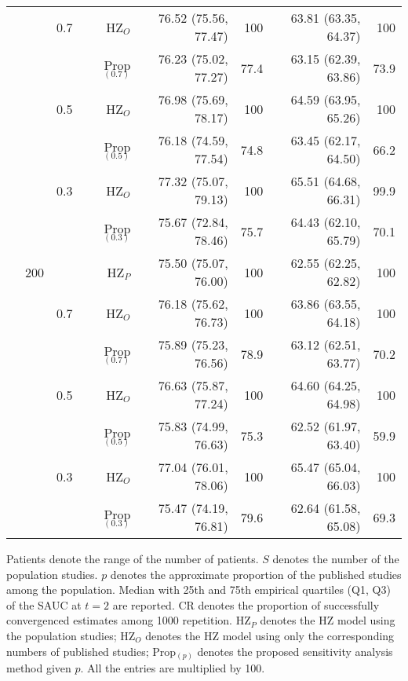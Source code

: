 \begin{table}[!htb]
\begin{threeparttable}
\begin{tabular}[t]{rrrrrrrr}
 &  & 0.7 & HZ$_O$ & 76.52 (75.56, 77.47) & 100 & 63.81 (63.35, 64.37) & 100\\
 &  &  & Prop$_{(0.7)}$ & 76.23 (75.02, 77.27) & 77.4 & 63.15 (62.39, 63.86) & 73.9\\
 &  & 0.5 & HZ$_O$ & 76.98 (75.69, 78.17) & 100 & 64.59 (63.95, 65.26) & 100\\
 &  &  & Prop$_{(0.5)}$ & 76.18 (74.59, 77.54) & 74.8 & 63.45 (62.17, 64.50) & 66.2\\
 &  & 0.3 & HZ$_O$ & 77.32 (75.07, 79.13) & 100 & 65.51 (64.68, 66.31) & 99.9\\
 &  &  & Prop$_{(0.3)}$ & 75.67 (72.84, 78.46) & 75.7 & 64.43 (62.10, 65.79) & 70.1\\
\addlinespace
 & 200 &  & HZ$_P$ & 75.50 (75.07, 76.00) & 100 & 62.55 (62.25, 62.82) & 100\\
 &  & 0.7 & HZ$_O$ & 76.18 (75.62, 76.73) & 100 & 63.86 (63.55, 64.18) & 100\\
 &  &  & Prop$_{(0.7)}$ & 75.89 (75.23, 76.56) & 78.9 & 63.12 (62.51, 63.77) & 70.2\\
 &  & 0.5 & HZ$_O$ & 76.63 (75.87, 77.24) & 100 & 64.60 (64.25, 64.98) & 100\\
 &  &  & Prop$_{(0.5)}$ & 75.83 (74.99, 76.63) & 75.3 & 62.52 (61.97, 63.40) & 59.9\\
 &  & 0.3 & HZ$_O$ & 77.04 (76.01, 78.06) & 100 & 65.47 (65.04, 66.03) & 100\\
 &  &  & Prop$_{(0.3)}$ & 75.47 (74.19, 76.81) & 79.6 & 62.64 (61.58, 65.08) & 69.3\\
\bottomrule
\end{tabular}
\begin{tablenotes}
\item 
  Patients denote the range of the number of patients.
  $S$ denotes the number of the population studies.
  $p$ denotes the approximate proportion of the published studies among the population.
	Median with 25th and 75th empirical quartiles (Q1, Q3) of the SAUC at $t=2$ are reported. 
	CR denotes the proportion of successfully convergenced estimates among 1000 repetition.
	HZ$_P$ denotes the HZ model using the population studies; 
	HZ$_O$ denotes the HZ model using only the corresponding numbers of published studies;
	Prop$_{(p)}$ denotes the proposed sensitivity analysis method given $p$.
	All the entries are multiplied by 100.
\end{tablenotes}
\end{threeparttable}
\end{table}

